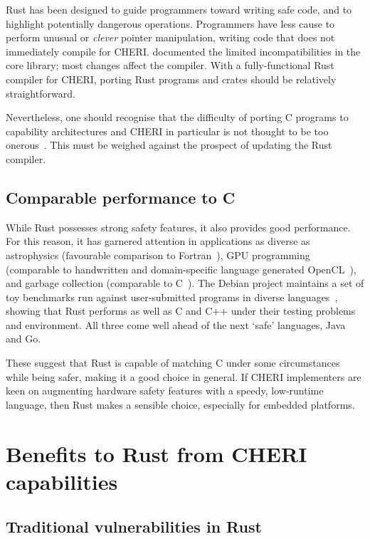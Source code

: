 \documentclass[dissertation.tex]{subfiles}
\begin{document}
Rust has been designed to guide programmers toward writing safe code,
and to highlight potentially dangerous operations.
Programmers have less cause to perform unusual or \emph{clever} pointer
manipulation, writing code that does not immediately compile for CHERI.
 documented the limited incompatibilities in the core
library; most changes affect the compiler.
With a fully-functional Rust compiler for CHERI, porting Rust programs
and crates should be relatively straightforward.

Nevertheless, one should recognise that the difficulty of porting C
programs to capability architectures and CHERI in particular is not
thought to be too onerous~\cite{capsicum-usability}.
This must be weighed against the prospect of updating the Rust compiler.


\subsection{Comparable performance to C}
\label{eval:cheri-perf}

While Rust possesses strong safety features, it also provides good
performance.
For this reason, it has garnered attention in applications as diverse as
astrophysics (favourable comparison to Fortran~\cite{blanco-astro}), GPU
programming (comparable to handwritten and domain-specific language
generated OpenCL~\cite{holk-gpu}), and garbage collection (comparable to
C~\cite{lin-gc}).
The Debian project maintains a set of toy benchmarks run against
user-submitted programs in diverse
languages~\cite{debian-benchmarksgame}, showing that Rust performs as
well as C and C++ under their testing problems and environment.
All three come well ahead of the next `safe' languages, Java and Go.

These suggest that Rust is capable of matching C under some
circumstances while being safer, making it a good choice in general.
If CHERI implementers are keen on augmenting hardware safety features
with a speedy, low-runtime language, then Rust makes a sensible choice,
especially for embedded platforms.


\section{Benefits to Rust from CHERI capabilities}
\label{sec:eval-rust}

\subsection{Traditional vulnerabilities in Rust}
\label{sec:eval-rust-vulns}
\end{document}
